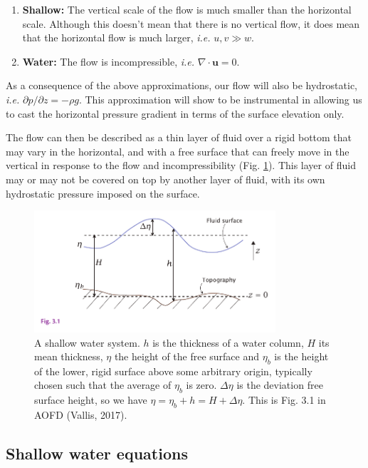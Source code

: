 \documentclass[12pt]{article}
\numberwithin{equation}{section}
\numberwithin{figure}{section}
\numberwithin{table}{section}
\begin{document}
\begin{enumerate}
  \item \textbf{Shallow:} The vertical scale of the flow is much smaller than the
    horizontal scale. Although this doesn't mean that there is no vertical
    flow, it does mean that the horizontal flow is much larger,
    \textit{i.e.} $u, v \gg w$.
  \item \textbf{Water:} The flow is incompressible, \textit{i.e.}
  $\nabla \cdot \mathbf{u} = 0$.
\end{enumerate}
As a consequence of the above approximations, our flow will also be hydrostatic,
\textit{i.e.} $\partial p / \partial z = -\rho g$.
This approximation will show to be instrumental in allowing us to cast the 
horizontal pressure gradient in terms of the surface elevation only.

The flow can then be described as a thin layer of fluid over a rigid bottom
that may vary in the horizontal, and with a free surface that can freely
move in the vertical in response to the flow and incompressibility
(Fig. \ref{fig:shallow_water1}).
This layer of fluid may or may not be covered on top by another layer of fluid,
with its own hydrostatic pressure imposed on the surface.

\begin{figure}[h]
  \centering
  \includegraphics[width=0.8\textwidth]{assets/fig_shallow_water1.pdf}
  \caption{
    A shallow water system.
    $h$ is the thickness of a water column, $H$ its mean thickness, $\eta$ the
    height of the free surface and $\eta_b$ is the height of the lower, rigid
    surface above some arbitrary origin, typically chosen such that the average
    of $\eta_b$ is zero.
    $\Delta \eta$ is the deviation free surface height, so we have
    $\eta = \eta_b + h = H + \Delta \eta$.
    This is Fig. 3.1 in AOFD (Vallis, 2017).
  }
  \label{fig:shallow_water1}
\end{figure}

\subsection{Shallow water equations}
\end{document}
